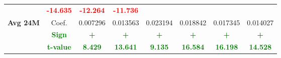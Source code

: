 \documentclass[11pt,english,a4paper,hidelinks]{book}
\begin{document}
\begin{table}[H]
\begin{tabular}{lccccccc}
                     & \textbf{\textcolor{red}{-14.635}}
                     & \textbf{\textcolor{red}{-12.264}}
                     & \textbf{\textcolor{red}{-11.736}} \\
        \cmidrule{1-8}
        \multirow{3}{*}{\textbf{Avg 24M}}
            & Coef.   & 0.007296  & 0.013563  & 0.023194  & 0.018842  & 0.017345  & 0.014027  \\
            & \textbf{\textcolor{green}{Sign}}
                     & \textbf{\textcolor{green}{+}}
                     & \textbf{\textcolor{green}{+}}
                     & \textbf{\textcolor{green}{+}}
                     & \textbf{\textcolor{green}{+}}
                     & \textbf{\textcolor{green}{+}}
                     & \textbf{\textcolor{green}{+}} \\
            & \textbf{\textcolor{green}{t-value}}
                     & \textbf{\textcolor{green}{8.429}}
                     & \textbf{\textcolor{green}{13.641}}
                     & \textbf{\textcolor{green}{9.135}}
                     & \textbf{\textcolor{green}{16.584}}
                     & \textbf{\textcolor{green}{16.198}}
                     & \textbf{\textcolor{green}{14.528}} \\
        
        \bottomrule
    \end{tabular}
    \label{tab:south_america_growth_consistency}
\end{table}
\end{document}
